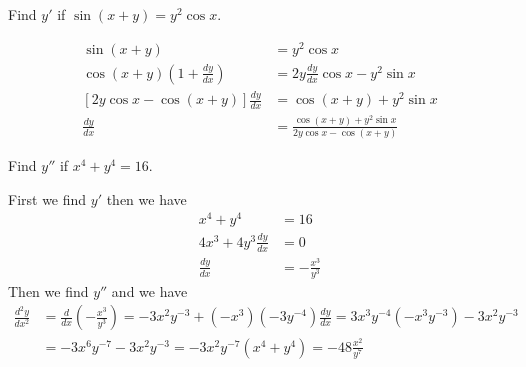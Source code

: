\begin{problem}
    Find \(y'\) if \(\sin(x+y)=y^2\cos x\).
\end{problem}
\begin{solution}
    \begin{align*}
        \sin(x+y) &= y^2\cos x \\
        \cos(x+y)(1+\frac{dy}{dx}) &= 2y\frac{dy}{dx}\cos x-y^2\sin x \\
        [2y\cos x-\cos(x+y)]\frac{dy}{dx} &= \cos(x+y)+y^2\sin x \\
        \frac{dy}{dx}
        &= \frac{\cos(x+y)+y^2\sin x}{2y\cos x-\cos(x+y)} 
    \end{align*}
\end{solution}
\begin{problem}
    Find \(y''\) if \(x^4+y^4=16\).
\end{problem}
\begin{solution}
    First we find \(y'\) then we have
    \begin{align*}
        x^4+y^4 &= 16 \\ 4x^3+4y^3\frac{dy}{dx} &= 0 \\
        \frac{dy}{dx} &= -\frac{x^3}{y^3}
    \end{align*}
    Then we find \(y''\) and we have
    \begin{align*}
        \frac{d^2y}{dx^2} &= \frac{d}{dx}\left(-\frac{x^3}{y^3}\right)
        =-3x^2y^{-3}+(-x^3)(-3y^{-4})\frac{dy}{dx}
        =3x^3y^{-4}(-x^3y^{-3})-3x^2y^{-3} \\
        &= -3x^6y^{-7}-3x^2y^{-3}
        =-3x^2y^{-7}(x^4+y^4)=-48\frac{x^2}{y^7} 
    \end{align*}
\end{solution}